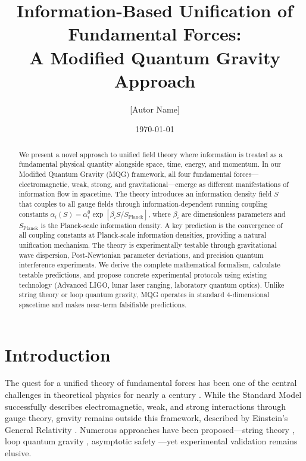 \documentclass[twocolumn,prd,superscriptaddress,nofootinbib]{revtex4-2}
\newcommand{\sfield}{S}
\newcommand{\splanck}{S_{\text{Planck}}}
\begin{document}
\title{Information-Based Unification of Fundamental Forces:\\A Modified Quantum Gravity Approach}

\author{[Autor Name]}
\affiliation{[Institution]}

\date{\today}

\begin{abstract}
We present a novel approach to unified field theory where information is treated as a fundamental physical quantity alongside space, time, energy, and momentum. In our Modified Quantum Gravity (MQG) framework, all four fundamental forces---electromagnetic, weak, strong, and gravitational---emerge as different manifestations of information flow in spacetime. The theory introduces an information density field $\sfield$ that couples to all gauge fields through information-dependent running coupling constants $\alpha_i(\sfield) = \alpha_i^0 \exp[\beta_i \sfield/\splanck]$, where $\beta_i$ are dimensionless parameters and $\splanck$ is the Planck-scale information density. A key prediction is the convergence of all coupling constants at Planck-scale information densities, providing a natural unification mechanism. The theory is experimentally testable through gravitational wave dispersion, Post-Newtonian parameter deviations, and precision quantum interference experiments. We derive the complete mathematical formalism, calculate testable predictions, and propose concrete experimental protocols using existing technology (Advanced LIGO, lunar laser ranging, laboratory quantum optics). Unlike string theory or loop quantum gravity, MQG operates in standard 4-dimensional spacetime and makes near-term falsifiable predictions.
\end{abstract}

\maketitle

\section{Introduction}

The quest for a unified theory of fundamental forces has been one of the central challenges in theoretical physics for nearly a century \cite{Einstein1950,Weinberg1967}. While the Standard Model successfully describes electromagnetic, weak, and strong interactions through gauge theory, gravity remains outside this framework, described by Einstein's General Relativity \cite{Einstein1915}. Numerous approaches have been proposed---string theory \cite{Green1987}, loop quantum gravity \cite{Rovelli2004}, asymptotic safety \cite{Weinberg1979}---yet experimental validation remains elusive.
\end{document}
